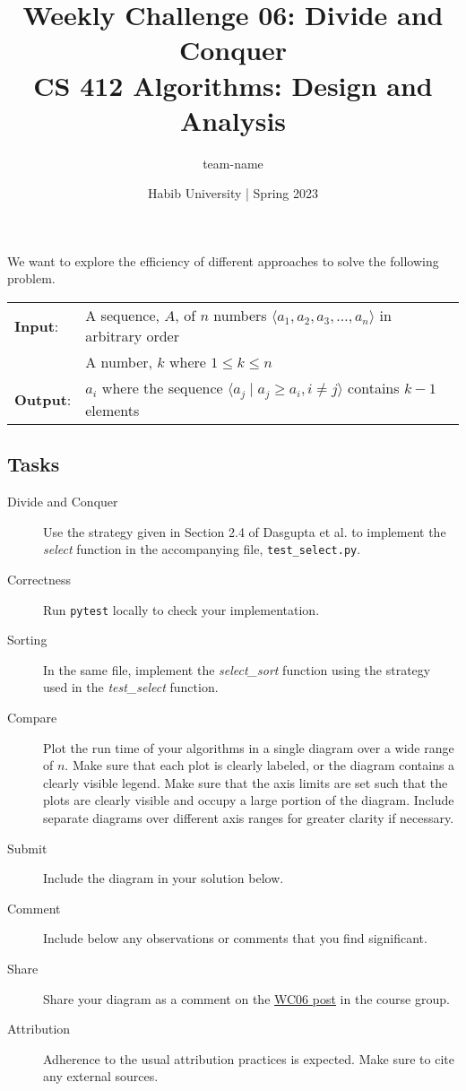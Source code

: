 \documentclass[a4paper]{exam}
\title{Weekly Challenge 06: Divide and Conquer\\CS 412 Algorithms: Design and Analysis}
\author{team-name}  %
\date{Habib University | Spring 2023}
\begin{document}
\maketitle

\begin{questions}

  

  We want to explore the efficiency of different approaches to solve the following problem.

  \begin{tabular}{ll}
    \textbf{Input}: & A sequence, $A$, of $n$ numbers $\langle a_1, a_2, a_3, \ldots, a_n \rangle$ in arbitrary order \\
            & A number, $k$ where $1 \leq k \leq n$\\
    \textbf{Output}: & $a_i$ where the sequence $\langle a_j \mid a_j \geq a_i, i\neq j \rangle$ contains $k-1$ elements
  \end{tabular}
  \smallskip

  \subsection*{Tasks}
  \begin{description}
  \item[Divide and Conquer] Use the strategy given in Section 2.4 of Dasgupta et al. to implement the \textit{select} function in the accompanying file, \texttt{test\_select.py}.
  \item[Correctness] Run \texttt{pytest} locally to check your implementation.
  \item[Sorting] In the same file, implement the \textit{select\_sort} function using the strategy used in the \textit{test\_select} function.
  \item[Compare] Plot the run time of your algorithms in a single diagram over a wide range of $n$. Make sure that each plot is clearly labeled, or the diagram contains a clearly visible legend. Make sure that the axis limits are set such that the plots are clearly visible and occupy a large portion of the diagram. Include separate diagrams over different axis ranges for greater clarity if necessary.
  \item[Submit] Include the diagram in your solution below.
  \item[Comment] Include below any observations or comments that you find significant.
  \item[Share] Share your diagram as a comment on the \href{https://web.yammer.com/main/org/habib.edu.pk/threads/eyJfdHlwZSI6IlRocmVhZCIsImlkIjoiMjEzNDMyMjU5OTgxMzEyMCJ9}{WC06 post} in the course group.
  \item[Attribution] Adherence to the usual attribution practices is expected. Make sure to cite any external sources.
  \end{description}
  
  \begin{solution}
  \end{solution}

\end{questions}
\end{document}
